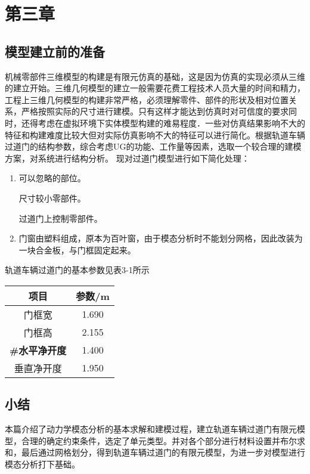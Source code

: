 \section{第三章}
\subsection{模型建立前的准备}
机械零部件三维模型的构建是有限元仿真的基础，这是因为仿真的实现必须从三维的建立开始。三维几何模型的建立一般需要花费工程技术人员大量的时间和精力，工程上三维几何模型的构建非常严格，必须理解零件、部件的形状及相对位置关系，严格按照实际的尺寸进行建模。只有这样才能达到仿真时对可信度的要求同时，还得考虑在虚拟环境下实体模型构建的难易程度．一些对仿真结果影响不大的特征和构建难度比较大但对实际仿真影响不大的特征可以进行简化。根据轨道车辆过道门的结构参数，综合考虑UG的功能、工作量等因素，选取一个较合理的建模方案，对系统进行结构分析。
现对过道门模型进行如下简化处理：

\begin{enumerate}[label=(\arabic*)]
    \item 可以忽略的部位。
    
     尺寸较小零部件。

     过道门上控制零部件。
    
    \item 门窗由塑料组成，原本为百叶窗，由于模态分析时不能划分网格，因此改装为一块合金板，与门框固定起来。
\end{enumerate}

轨道车辆过道门的基本参数见表3-1所示

\begin{table}[hp]
    \centering
    \begin{tabular}{cc}
        \toprule[1.5pt]
        项目               & 参数/m  \\
        \midrule[1pt]
        门框宽              & 1.690 \\
        门框高              & 2.155 \\
        \textbf{\#水平净开度} & 1.400 \\
        垂直净开度            & 1.950 \\
        \bottomrule[1.5pt]
    \end{tabular}
\end{table}

\subsection{小结}

本篇介绍了动力学模态分析的基本求解和建模过程，建立轨道车辆过道门有限元模型，合理的确定约束条件，选定了单元类型。并对各个部分进行材料设置并布尔求和，最后通过网格划分，得到轨道车辆过道门的有限元模型，为进一步对模型进行模态分析打下基础。

